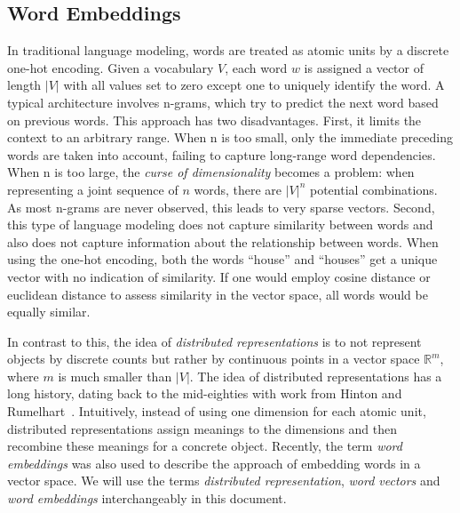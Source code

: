 \documentclass{sig-alternate-05-2015}
\begin{document}

\subsection{Word Embeddings}

In traditional language modeling, words are treated as atomic units by a discrete one-hot encoding.
Given a vocabulary $V$, each word $w$ is assigned a vector of length $|V|$ with all values set to zero except one to uniquely identify the word.
A typical architecture involves n-grams, which try to predict the next word based on previous words.
This approach has two disadvantages.
First, it limits the context to an arbitrary range.
When n is too small, only the immediate preceding words are taken into account, failing to capture long-range word dependencies.
When n is too large, the \emph{curse of dimensionality} becomes a problem: when representing a joint sequence of $n$ words, there are $|V|^n$ potential combinations.
As most n-grams are never observed, this leads to very sparse vectors.
Second, this type of language modeling does not capture similarity between words and also does not capture information about the relationship between words.
When using the one-hot encoding, both the words ``house'' and ``houses'' get a unique vector with no indication of similarity.
If one would employ cosine distance or euclidean distance to assess similarity in the vector space, all words would be equally similar.

In contrast to this, the idea of \emph{distributed representations} is to not represent objects by discrete counts but rather by continuous points in a vector space $\mathbb{R}^m$, where $m$ is much smaller than $|V|$.
The idea of distributed representations has a long history, dating back to the mid-eighties with work from Hinton and Rumelhart~\cite{Hinton1986,Rumelhart1988}.
Intuitively, instead of using one dimension for each atomic unit, distributed representations assign meanings to the dimensions and then recombine these meanings for a concrete object.
Recently, the term \emph{word embeddings} was also used to describe the approach of embedding words in a vector space.
We will use the terms \emph{distributed representation}, \emph{word vectors} and \emph{word embeddings} interchangeably in this document.
\end{document}
